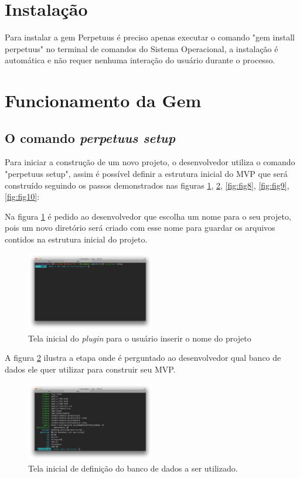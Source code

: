 \section{Instala\c{c}\~ao}

Para instalar a gem Perpetuus \'e preciso apenas executar o comando "gem install perpetuus" no terminal de comandos do Sistema Operacional, a instala\c{c}\~ao \'e autom\'atica e n\~ao requer nenhuma intera\c{c}\~ao do usu\'ario durante o processo.

\section{Funcionamento da Gem}

\subsection{O comando \emph{perpetuus setup}}

Para iniciar a constru\c{c}\~ao de um novo projeto, o desenvolvedor utiliza o comando "perpetuus setup", assim \'e poss\'ivel definir a estrutura inicial do MVP que ser\'a constru\'ido seguindo os passos demonstrados nas figuras \ref{fig:fig6}, \ref{fig:fig7}, \ref{fig:fig8}, \ref{fig:fig9}, \ref{fig:fig10}:

Na figura \ref{fig:fig6} \'e pedido ao desenvolvedor que escolha um nome para o seu projeto, pois um novo diret\'orio ser\'a criado com esse nome para guardar os arquivos contidos na estrutura inicial do projeto.

\begin{figure}[h]
  \centering
  \includegraphics[width=0.5\textwidth]{./fig/setup1}
  \caption{Tela inicial do \emph{plugin} para o usu\'ario inserir o nome do projeto}
  \label{fig:fig6}
\end{figure}

A figura \ref{fig:fig7} ilustra a etapa onde \'e perguntado ao desenvolvedor qual banco de dados ele quer utilizar para construir seu MVP.

\begin{figure}[h]
  \centering
  \includegraphics[width=0.5\textwidth]{./fig/setup2}
  \caption{Tela inicial de defini\c{c}\~ao do banco de dados a ser utilizado.}
  \label{fig:fig7}
\end{figure}


